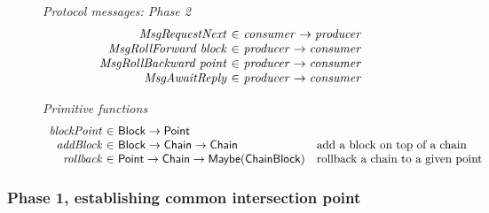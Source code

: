 \documentclass{article}
\newcommand{\var}[1]{\mathit{#1}}
\newcommand{\type}[1]{\mathsf{#1}}
\theoremstyle{definition}{
  \newtheorem{lemma}{Lemma}[section] %
  \newtheorem{definition}[lemma]{Definition}
}
\theoremstyle{theorem}{
  \newtheorem{invariant}[lemma]{Invariant}
  \newtheorem{proofobligation}[lemma]{Proof Obligation}
}
\numberwithin{equation}{lemma}
\begin{document}
\begin{figure}[H]
    \emph{Protocol messages: Phase 2}
    \begin{equation*}
        \begin{array}{r@{~\in~}ll}
            \var{MsgRequestNext}               & \var{consumer} \to \var{producer} \\
            \var{MsgRollForward}\;\var{block}  & \var{producer} \to \var{consumer} \\
            \var{MsgRollBackward}\;\var{point} & \var{producer} \to \var{consumer} \\
            \var{MsgAwaitReply}                & \var{producer} \to \var{consumer} \\
        \end{array}
    \end{equation*}

    \emph{Primitive functions}
    \begin{equation*}
        \begin{array}{r@{~\in~}ll}
            \var{blockPoint} & \type{Block} \to \type{Point}                                & \\
            \var{addBlock}   & \type{Block} \to \type{Chain} \to \type{Chain}               & \text{add a block on top of a chain} \\
            \var{rollback}   & \type{Point} \to \type{Chain} \to \type{Maybe (Chain Block)} & \text{rollback a chain to a given point}  \\
        \end{array}
    \end{equation*}
\end{figure}

\subsubsection{Phase 1, establishing common intersection point}

\begin{center}
\end{center}
\end{document}
